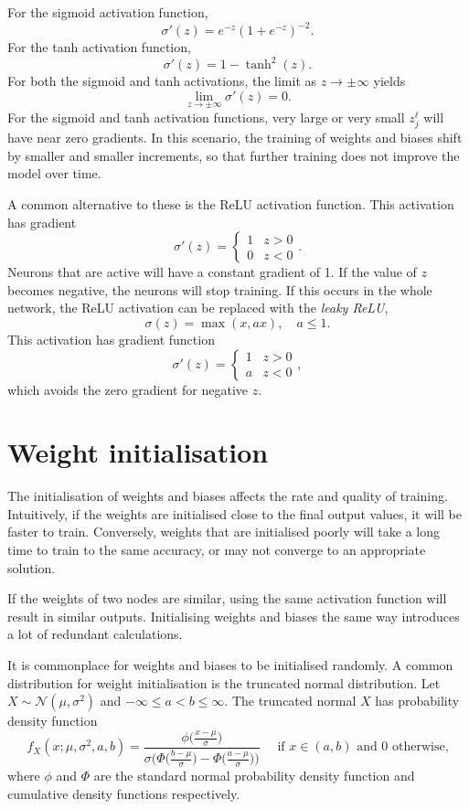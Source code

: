 \noindent For the sigmoid activation function,
\[
	\sigma '(z) = e^{-z}(1+e^{-z})^{-2}.
\]
For the tanh activation function,
\[
	\sigma '(z) = 1-\tanh^2(z).
\]
For both the sigmoid and tanh activations, the limit as $z\rightarrow\pm\infty$ yields 
\[
	\lim_{z\rightarrow\pm\infty}\sigma '(z)= 0.
\]
For the sigmoid and tanh activation functions, very large or very small $z_j^\ell$ will have near zero gradients. In this scenario, the training of weights and biases shift by smaller and smaller increments, so that further training does not improve the model over time.

A common alternative to these is the ReLU activation function. This activation has gradient
\[
	\sigma '(z) = \begin{cases}
		1 & z > 0 \\
		0 & z < 0
	\end{cases}.
\]
Neurons that are active will have a constant gradient of 1. If the value of $z$ becomes negative, the neurons will stop training. If this occurs in the whole network, the ReLU activation can be replaced with the \textit{leaky ReLU},
\[
	\sigma(z) = \max(x, ax), \quad a \le 1.
\]
This activation has gradient function
\[
	\sigma '(z) = \begin{cases}
		1 & z > 0 \\
		a & z < 0
	\end{cases},
\]
which avoids the zero gradient for negative $z$.

\section{Weight initialisation}

The initialisation of weights and biases affects the rate and quality of training. Intuitively, if the weights are initialised close to the final output values, it will be faster to train. Conversely, weights that are initialised poorly will take a long time to train to the same accuracy, or may not converge to an appropriate solution.

If the weights of two nodes are similar, using the same activation function will result in similar outputs. Initialising weights and biases the same way introduces a lot of redundant calculations. 

It is commonplace for weights and biases to be initialised randomly. A common distribution for weight initialisation is the truncated normal distribution. Let $X\sim\mathcal{N}(\mu,\sigma^2)$ and $-\infty \le a < b \le \infty$. The truncated normal $X$ has probability density function
\[
	f_X(x;\mu, \sigma^2,a,b) = \dfrac{\phi\big(\frac{x-\mu}{\sigma}\big)}{\sigma\bigg(\Phi\big(\frac{b-\mu}{\sigma}\big) - \Phi\big(\frac{a-\mu}{\sigma}\big)\bigg)}\quad \text{ if } x \in (a,b) \text{ and 0 otherwise,}
\]
where $\phi$ and $\Phi$ are the standard normal probability density function and cumulative density functions respectively.

